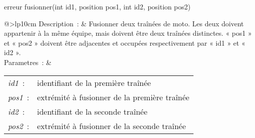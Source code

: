\begin{minipage}{\linewidth}

\begin{lst-c++}
erreur fusionner(int id1, position pos1, int id2, position pos2)
\end{lst-c++}

\noindent
\begin{tabular}[t]{@{\extracolsep{0pt}}>{\bfseries}lp{10cm}}
Description~: & Fusionner deux traînées de moto. Les deux doivent appartenir à la même équipe, mais doivent être deux traînées distinctes. « pos1 » et « pos2 » doivent être adjacentes et occupées respectivement par « id1 » et « id2 ». \\


Parametres~: &
\begin{tabular}[t]{@{\extracolsep{0pt}}ll}
    
    
      
        \textsl{id1}~: & identifiant de la première traînée \\
      
    
      
        \textsl{pos1}~: & extrémité à fusionner de la première traînée \\
      
    
      
        \textsl{id2}~: & identifiant de la seconde traînée \\
      
    
      
        \textsl{pos2}~: & extrémité à fusionner de la seconde traînée \\
      
    
  \end{tabular} \\






\end{tabular} \\[0.3cm]
\end{minipage}
